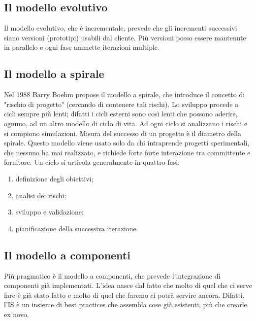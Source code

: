 \documentclass[a4paper]{article}
\begin{document}
		
	\subsection{Il modello evolutivo}

		
Il modello evolutivo, che è incrementale, prevede che gli incrementi successivi siano versioni (prototipi) usabili dal cliente. Più versioni posso essere mantenute in parallelo e ogni fase ammette iterazioni multiple. %


		
	\subsection{Il modello a spirale}

		
Nel 1988 Barry Boehm propose il modello a spirale, che introduce il concetto di "rischio di progetto" (cercando di contenere tali rischi). Lo sviluppo procede a cicli sempre più lenti; difatti i cicli esterni sono così lenti che possono aderire, ognuno, ad un altro modello di ciclo di vita. Ad ogni ciclo si analizzano i rischi e si compiono simulazioni. Misura del successo di un progetto è il diametro della spirale. Questo modello viene usato solo da chi intraprende progetti sperimentali, che nessuno ha mai realizzato, e richiede forte forte interazione tra committente e fornitore. Un ciclo si articola generalmente in quattro fasi:
		
	\begin{enumerate}
		
			
	\item definizione degli obiettivi;
			
	\item analisi dei rischi;
			
	\item sviluppo e validazione;
			
	\item pianificazione della successiva iterazione.
		
	\end{enumerate}


		
	\subsection{Il modello a componenti}

		
Più pragmatico è il modello a componenti, che prevede l'integrazione di componenti già implementati. L'idea nasce dal fatto che molto di quel che ci serve fare è già stato fatto e molto di quel che faremo ci potrà servire ancora. Difatti, l'IS è un insieme di best practices che assembla cose già esistenti, più che crearle ex novo.
\end{document}
